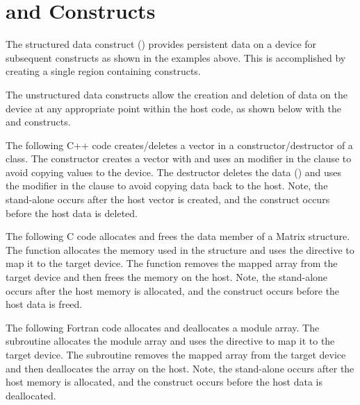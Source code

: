 \pagebreak
\section{   and    Constructs}
\label{sec:target_enter_exit_data}

The structured data construct () provides persistent data on a
device for subsequent  constructs as shown in the 
 examples above. This is accomplished by creating a single
 region containing  constructs.

The unstructured data constructs allow the creation and deletion of data on
the device at any appropriate point within the host code, as shown below 
with the  and  constructs.

The following C++ code creates/deletes a vector in a constructor/destructor 
of a class. The constructor creates a vector with 
and uses an  modifier in the  clause to avoid copying values
to the device. The destructor deletes the data ()
and uses the  modifier in the  clause to avoid copying data
back to the host. Note, the stand-alone  occurs 
after the host vector is created, and the 
construct occurs before the host data is deleted.

The following C code allocates and frees the data member of a Matrix structure.
The  function allocates the memory used in the structure and
uses the  directive to map it to the target device. The
 function removes the mapped array from the target device
and then frees the memory on the host.  Note, the stand-alone  occurs after the host memory is allocated, and the  construct occurs before the host data is freed.

The following Fortran code allocates and deallocates a module array.  The
 subroutine allocates the module array and uses the
 directive to map it to the target device. The
 subroutine removes the mapped array from the target device and
then deallocates the array on the host.  Note, the stand-alone  occurs after the host memory is allocated, and the  construct occurs before the host data is deallocated.

